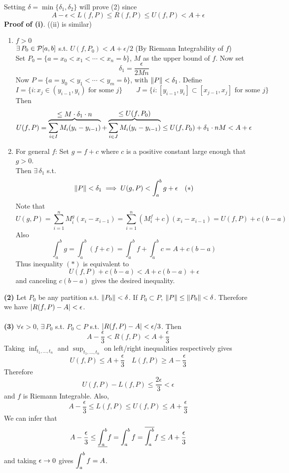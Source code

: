 Setting $\delta = \min \{\delta_1, \delta_2\}$ will prove (2) since
$$ A-\epsilon < L(f, P) \leq R(f, P) \leq U(f, P) < A+\epsilon $$
\textbf{Proof of (i)}. ((ii) is similar)
\begin{enumerate}
	\item $f > 0$\\
	$\exists\,P_0\in \mathcal{P}[a, b]$ s.t. $U(f, P_0) < A+\epsilon / 2$ (By Riemann Integrability of $f$)\\
	Set $P_0= \{a = x_0 < x_1 < \cdots < x_n = b\}$, $M$ as the upper bound of $f$. Now set $$\delta_1 = \frac{\epsilon}{2Mn}$$
	Now $P = \{a = y_0 < y_1 <\cdots < y_m=b \}$, with $\left\lVert P\right\rVert <\delta_1$. Define
	$$ I = \{i: x_j \in (y_{i-1}, y_{i}) \text{ for some }j\} \qquad J = \{i:[y_{i-1}, y_i]\subset [x_{j-1}, x_j] \text{ for some } j \}$$
	Then
	$$U(f, P) = \overbrace{\sum_{i\in I} M_i(y_i - y_{i - 1})}^{\displaystyle \leq M \cdot \delta_1\cdot n}+ \overbrace{\sum_{i\in J} M_i(y_i - y_{i-1})}^{\displaystyle \leq U(f, P_0)} \leq U(f, P_0) + \delta_1 \cdot nM < A+ \epsilon$$
	\item For general $f$: Set $g = f+c$ where $c$ is a positive constant large enough that $g > 0$.\\
	Then $\exists\, \delta_1$ s.t.
	$$\left\lVert P\right\rVert < \delta_1 \implies U(g, P) < \int_a^b g + \epsilon \quad (*)$$
	Note that $$U(g, P) = \sum_{i=1}^n M_i^g (x_i -x_{i-1}) = \sum_{i=1}^{n} (M_i^f + c)(x_i-x_{i-1}) = U(f, P) + c(b-a)$$
	Also
	$$\int_a^b g = \int_a^b (f+c) = \int_a^b f + \int_a^b c = A + c(b-a)$$
	Thus inequality $(*)$ is equivalent to
	$$U(f, P) + c(b-a) < A + c(b-a) + \epsilon$$
	and canceling $c(b-a)$ gives the desired inequality.
\end{enumerate}
\textbf{(2)} Let $P_0$ be any partition s.t. $\left\lVert P_0\right\rVert < \delta$. If $P_0\subset P$, $\left\lVert P\right\rVert \leq \left\lVert P_0\right\rVert<\delta$. Therefore we have $\left|R(f, P) - A\right| < \epsilon$.\\
\\
\textbf{(3)} $\forall \epsilon > 0$, $\exists\,P_0$ s.t. $P_0\subset P$ s.t. $\left|R(f, P) - A\right| < \epsilon / 3$. Then
$$A  - \frac{\epsilon}{3} < R(f, P) < A + \frac{\epsilon}{3}$$
Taking $\inf_{t_1, \dots, t_n}$ and $\sup_{t_1, \dots, t_n}$ on left/right inequalities respectively gives
$$ U(f, P) \leq A + \frac{\epsilon}{3} \quad L(f, P) \geq A - \frac{\epsilon}{3}$$
Therefore
$$U(f, P) - L(f, P) \leq \frac{2\epsilon}{3} <\epsilon$$
and $f$ is Riemann Integrable. Also,
$$ A - \frac{\epsilon}{3} \leq L(f, P) \leq U(f, P) \leq A+\frac{\epsilon}{3}$$
We can infer that
$$A - \frac{\epsilon}{3} \leq \underline{\int_a^b} f = \int_a^b f = \overline{\int_a^b} f \leq A +\frac{\epsilon}{3}$$
and taking $\epsilon\rightarrow0$ gives $\displaystyle \int_a^b f= A$.
\pagebreak
